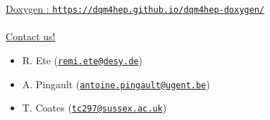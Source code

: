 \documentclass[presentation, 10pt]{beamer}
\begin{document}
\begin{frame}
\begin{minipage}{0.03\linewidth}
  \end{minipage}
  \href{https://dqm4hep.github.io/dqm4hep-doxygen/}{Doxygen : \tt https://dqm4hep.github.io/dqm4hep-doxygen/} \\
  ~\\
  \underline{Contact us!}
  \begin{itemize}
    \item R. Ete (\href{mailto:remi.ete@desy.de}{\tt remi.ete@desy.de}) 
    \item A. Pingault (\href{mailto:antoine.pingault@ugent.be}{\tt antoine.pingault@ugent.be})
    \item T. Coates (\href{mailto:tc297@sussex.ac.uk}{\tt tc297@sussex.ac.uk})
  \end{itemize}

\end{frame}
\end{document}
